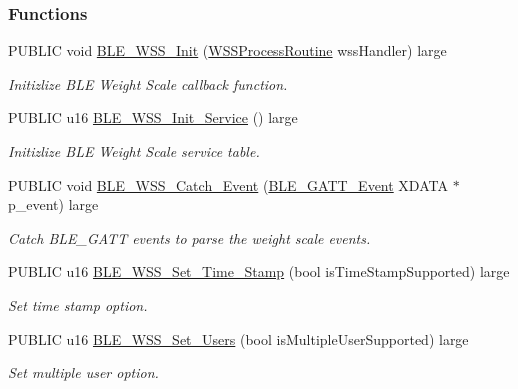 \subsubsection*{Functions}
\begin{DoxyCompactItemize}
\item 
P\+U\+B\+L\+IC void \hyperlink{group___b_l_e___w_s_s_gaf3853cc63f2d66448941a2bf3804976f}{B\+L\+E\+\_\+\+W\+S\+S\+\_\+\+Init} (\hyperlink{group___b_l_e___w_s_s_ga2bc7cdc055649fbb18b2b58bea522557}{W\+S\+S\+Process\+Routine} wss\+Handler) large
\begin{DoxyCompactList}\small\item\em Initizlize B\+LE Weight Scale callback function. \end{DoxyCompactList}\item 
P\+U\+B\+L\+IC u16 \hyperlink{group___b_l_e___w_s_s_ga0e2e9eed9887b82462fa3bd2bb63432a}{B\+L\+E\+\_\+\+W\+S\+S\+\_\+\+Init\+\_\+\+Service} () large
\begin{DoxyCompactList}\small\item\em Initizlize B\+LE Weight Scale service table. \end{DoxyCompactList}\item 
P\+U\+B\+L\+IC void \hyperlink{group___b_l_e___w_s_s_ga45441fa872d0efd88bf7af9d8323c975}{B\+L\+E\+\_\+\+W\+S\+S\+\_\+\+Catch\+\_\+\+Event} (\hyperlink{struct_b_l_e___g_a_t_t___event}{B\+L\+E\+\_\+\+G\+A\+T\+T\+\_\+\+Event} X\+D\+A\+TA $\ast$p\+\_\+event) large
\begin{DoxyCompactList}\small\item\em Catch B\+L\+E\+\_\+\+G\+A\+TT events to parse the weight scale events. \end{DoxyCompactList}\item 
P\+U\+B\+L\+IC u16 \hyperlink{group___b_l_e___w_s_s_ga6bc165828974fd9700834cfc7e1bc455}{B\+L\+E\+\_\+\+W\+S\+S\+\_\+\+Set\+\_\+\+Time\+\_\+\+Stamp} (bool is\+Time\+Stamp\+Supported) large
\begin{DoxyCompactList}\small\item\em Set time stamp option. \end{DoxyCompactList}\item 
P\+U\+B\+L\+IC u16 \hyperlink{group___b_l_e___w_s_s_ga3be5eb4c10945ddfb91dfde3723d4a07}{B\+L\+E\+\_\+\+W\+S\+S\+\_\+\+Set\+\_\+\+Users} (bool is\+Multiple\+User\+Supported) large
\begin{DoxyCompactList}\small\item\em Set multiple user option. \end{DoxyCompactList}\item 

\end{DoxyCompactItemize}
